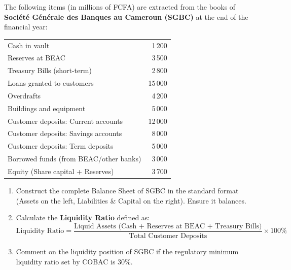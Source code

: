 \documentclass[11pt]{article}
\newcounter{popsec}
\newcounter{popsub}
\newcommand{\courssub}[1]{%
  \stepcounter{popsub}%
  \par\vspace{9pt}\noindent{\popxbold\fontsize{11.5}{13}\selectfont\color{popink}{\color{poporange}\thepopsec.\thepopsub}\hspace{6pt}#1}\par\nopagebreak\vspace{4pt}
}
\begin{document}
\courssub{I practise}

\begin{exercice}
The following items (in millions of FCFA) are extracted from the books of \textbf{Société Générale des Banques au Cameroun (SGBC)} at the end of the financial year:

\begin{center}
\begin{tabular}{lr}
Cash in vault & 1\,200 \\
Reserves at BEAC & 3\,500 \\
Treasury Bills (short-term) & 2\,800 \\
Loans granted to customers & 15\,000 \\
Overdrafts & 4\,200 \\
Buildings and equipment & 5\,000 \\
Customer deposits: Current accounts & 12\,000 \\
Customer deposits: Savings accounts & 8\,000 \\
Customer deposits: Term deposits & 5\,000 \\
Borrowed funds (from BEAC/other banks) & 3\,000 \\
Equity (Share capital + Reserves) & 3\,700 \\
\end{tabular}
\end{center}

\begin{enumerate}
\item Construct the complete Balance Sheet of SGBC in the standard format (Assets on the left, Liabilities \& Capital on the right). Ensure it balances.
\item Calculate the \textbf{Liquidity Ratio} defined as:
\[
\text{Liquidity Ratio} = \frac{\text{Liquid Assets (Cash + Reserves at BEAC + Treasury Bills)}}{\text{Total Customer Deposits}} \times 100\%
\]
\item Comment on the liquidity position of SGBC if the regulatory minimum liquidity ratio set by COBAC is $30\%$.
\end{enumerate}
\end{exercice}
\end{document}
